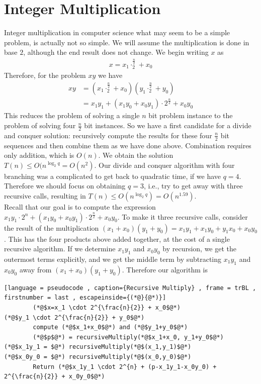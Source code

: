 \documentclass[a4paper]{article}
\theoremstyle{plain}
\theoremstyle{definition}
\theoremstyle{remark}
\begin{document}
	\section{Integer Multiplication}
		Integer multiplication in computer science what may seem to be a simple problem, is actually not so simple. We will assume the multiplication is done in base $2$, although the end result does not change. We begin writing $x$ as
		\begin{align*}
			x=x_1\cdot_2^{\frac{n}{2}} + x_0
		\end{align*}
		Therefore, for the problem $xy$ we have
		\begin{align*}
			xy &= (x_1 \cdot_2^{\frac{n}{2}}+x_0)(y_1\cdot_2^{\frac{n}{2}} + y_0) \\
			   &=x_1y_1+(x_1y_0+x_0y_1)\cdot 2^{\frac{n}{2}} + x_0y_0
		\end{align*}
		This reduces the problem of solving a single $n$ bit problem instance to the problem of solving four $\frac{n}{2}$ bit instances. So we have a first candidate for a divide and conquer solution: recursively compute the results for these four $\frac{n}{2}$ bit sequences and then combine them as we have done above. Combination requires only addition, which is $O(n)$. We obtain the solution $T(n) \le O(n^{\log_2 q}= O(n^2)$. Our divide and conquer algorithm with four branching was a complicated to get back to quadratic time, if we have $q=4$. Therefore we should focus on obtaining $q=3$, i.e., try to get away with three recursive calls, resulting in $T(n) \le  O(n^{\log_2 q}) = O(n^{1.59})$. \\
		Recall that our goal is to compute the expression $x_1y_1\cdot 2^{n} + (x_1y_0+x_0y_1)\cdot 2^{\frac{n}{2}}+x_0y_0$. To make it three recursive calls, consider the result of the multiplication $(x_1+x_0)(y_1+y_0) = x_1y_1+x_1y_0+y_1x_0+x_0y_0$. This has the four products above added together, at the cost of a single recursive algorithm. If we determine $x_1y_1$ and $x_0y_0$ by recursion, we get the outermost terms explicitly, and we get the middle term by subtracting $x_1y_1$ and $x_0y_0$ away from $(x_1+x_0)(y_1+y_0)$. Therefore our algorithm is
		\begin{lstlisting}[language = pseudocode , caption={Recursive Multiply} , frame = trBL , firstnumber = last , escapeinside={(*@}{@*)}]
		(*@$x=x_1 \cdot 2^{\frac{n}{2}} + x_0$@*)
(*@$y_1 \cdot 2^{\frac{n}{2}} + y_0$@*)
		compute (*@$x_1+x_0$@*) and (*@$y_1+y_0$@*)
		(*@$p$@*) = recursiveMultiply(*@$x_1+x_0, y_1+y_0$@*)
(*@$x_1y_1 = $@*) recursiveMultiply(*@$(x_1,y_1)$@*)
(*@$x_0y_0 = $@*) recursiveMultiply(*@$(x_0,y_0)$@*)
		Return (*@$x_1y_1 \cdot 2^{n} + (p-x_1y_1-x_0y_0) + 2^{\frac{n}{2}} + x_0y_0$@*)
		\end{lstlisting}
\end{document}
